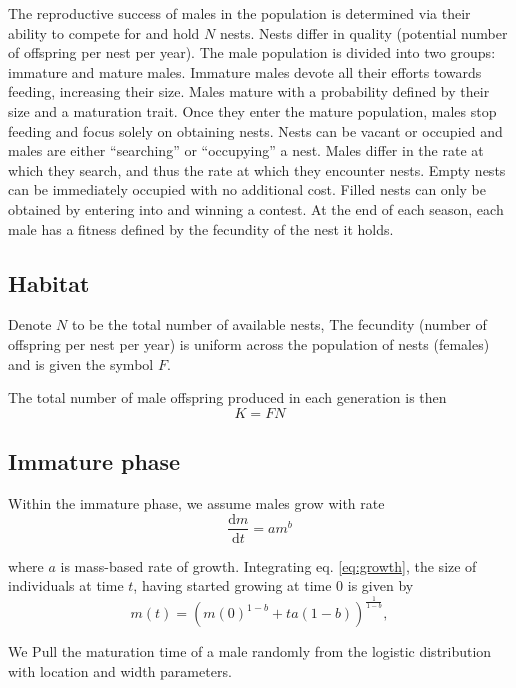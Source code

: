 \documentclass[a4paper,11pt]{article}
\begin{document}
The reproductive success of males in the population is determined via their ability to compete for and hold $N$ nests. Nests differ in quality (potential number of offspring per nest per year). The male population is divided into two groups: immature and mature males. Immature males devote all their efforts towards feeding, increasing their size. Males mature with a probability defined by their size and a maturation trait. Once they enter the mature population, males stop feeding and focus solely on obtaining nests. Nests can be vacant or occupied and males are either ``searching'' or ``occupying'' a nest. Males differ in the rate at which they search, and thus the rate at which they encounter nests. Empty nests can be immediately occupied with no additional cost. Filled nests can only be obtained by entering into and winning a contest. At the end of each season, each male has a fitness defined by the fecundity of the nest it holds.

\subsection{Habitat}

Denote $N$ to be the total number of available nests, The fecundity (number of offspring per nest per year) is uniform across the population of nests (females) and is given the symbol $F$.

The total number of male offspring produced in each generation is then
\begin{equation} \label{eq:pdf_F}
    K = F N
\end{equation}

\subsection{Immature phase}

Within the immature phase, we assume males grow with rate
\begin{equation} \label{eq:growth}
    \frac{{\mathrm d} m}{{\mathrm d} t} = a m^ b
\end{equation}

where $a$ is mass-based rate of growth. Integrating eq. \ref{eq:growth}, the size of individuals at time $t$, having started growing at time $0$ is given by
\begin{equation} \label{eq:growth}
    m(t) = \left(m(0)^{1-b} + t a(1-b)\right)^{\frac1{1-b}},
\end{equation}

We Pull the maturation time of a male randomly from the logistic distribution with location and width parameters.
\end{document}
